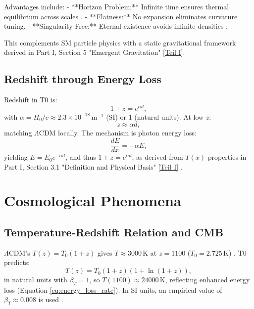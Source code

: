 \documentclass[12pt,a4paper]{article}
\newcommand{\Tfield}{T(x)}
\begin{document}
	Advantages include:
	- **Horizon Problem:** Infinite time ensures thermal equilibrium across scales \cite{pascher_messdifferenzen_2025}.
	- **Flatness:** No expansion eliminates curvature tuning.
	- **Singularity-Free:** Eternal existence avoids infinite densities \cite{pascher_perspective_2025}.
	
	This complements SM particle physics with a static gravitational framework derived in Part I, Section 5 "Emergent Gravitation" \href{https://github.com/jpascher/T0-Time-Mass-Duality/tree/main/2/pdf/English/QMRelTimeMassPart1En.pdf}{[Teil I]}.
	
	\subsection{Redshift through Energy Loss}
	\label{subsec:redshift_energy_loss}
	
	Redshift in T0 is:
	\begin{equation}
		1 + z = e^{\alpha d},
		\label{eq:redshift_distance}
	\end{equation}
	with \(\alpha = H_0 / c \approx 2.3 \times 10^{-18} \, \text{m}^{-1}\) (SI) or 1 (natural units). At low \(z\):
	\begin{equation}
		z \approx \alpha d,
		\label{eq:hubble_approx}
	\end{equation}
	matching \(\Lambda\)CDM locally. The mechanism is photon energy loss:
	\begin{equation}
		\frac{dE}{dx} = -\alpha E,
		\label{eq:energy_loss_rate}
	\end{equation}
	yielding \(E = E_0 e^{-\alpha d}\), and thus \(1 + z = e^{\alpha d}\), as derived from \(\Tfield\) properties in Part I, Section 3.1 "Definition and Physical Basis" \href{https://github.com/jpascher/T0-Time-Mass-Duality/tree/main/2/pdf/English/QMRelTimeMassPart1En.pdf}{[Teil I]} \cite{pascher_messdifferenzen_2025}.
	
	\section{Cosmological Phenomena}
	\label{sec:cosmological_phenomena}
	
	\subsection{Temperature-Redshift Relation and CMB}
	\label{subsec:cmb_temp}
	
	\(\Lambda\)CDM’s \(T(z) = T_0 (1 + z)\) gives \(T \approx 3000 \, \text{K}\) at \(z = 1100\) (\(T_0 = 2.725 \, \text{K}\)) \cite{Fixsen2009}. 
T0 predicts:
\begin{equation}
	T(z) = T_0 (1 + z) (1 + \ln(1 + z)),
	\label{eq:temperature_redshift_simplified}
\end{equation}
in natural units with \(\beta_T = 1\), so \(T(1100) \approx 24000 \, \text{K}\), reflecting enhanced energy loss (Equation \ref{eq:energy_loss_rate}). In SI units, an empirical value of \(\beta_T \approx 0.008\) is used \cite{pascher_temp_2025}.
\end{document}
